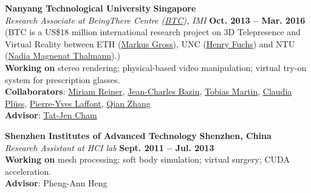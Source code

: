 \documentclass[margin,line]{resume}
\begin{document}
\begin{resume}
    \vspace{0.0mm}
    
    \textbf{Nanyang Technological University} \hfill \textbf{Singapore} \\
    \textsl{Research Associate at BeingThere Centre (\href{https://www.youtube.com/watch?v=Oy-xrxOB_4Q}{BTC}), IMI} \hfill \textbf{Oct. 2013 -- Mar. 2016}\\
    (BTC is a US\$18 million international research project on 3D Telepresence and Virtual Reality between ETH (\href{https://en.wikipedia.org/wiki/Markus_Gross}{Markus Gross}), UNC (\href{https://en.wikipedia.org/wiki/Henry_Fuchs}{Henry Fuchs}) and
    NTU (\href{https://en.wikipedia.org/wiki/Nadia_Magnenat_Thalmann}{Nadia Magnenat Thalmann}).)\\
    \textbf{Working on} stereo rendering; physical-based video manipulation; virtual try-on system for prescription glasses. \\
    \textbf{Collaborators}: \href{http://vrneurocog.wixsite.com/vrneurocog}{Miriam Reiner},
    \href{https://scholar.google.com/citations?user=XPZLx-8AAAAJ&hl=en}{Jean-Charles Bazin},
    \href{https://www.virtamed.com/en/about-us/team/tobias-martin-phd/}{Tobias Martin},
    \href{https://www.crunchbase.com/person/claudia-pluss}{Claudia Pl\"{u}ss},
    \href{http://www.py-laffont.info/}{Pierre-Yves Laffont},
    \href{https://qianzhanginfo.github.io/}{Qian Zhang} \\
    \textbf{Advisor}: \href{http://www.ntu.edu.sg/home/astjcham/}{Tat-Jen Cham} 

    \vspace{0.0mm}
    
    \textbf{Shenzhen Institutes of Advanced Technology}   \hfill \textbf{Shenzhen, China} \\
    \textsl{Research Assistant at HCI lab} \hfill \textbf{Sept. 2011 -- Jul. 2013} \\
    \textbf{Working on} mesh processing; soft body simulation; virtual surgery; CUDA acceleration. \\
    \textbf{Advisor}: Pheng-Ann Heng \\




\end{resume}
\end{document}
